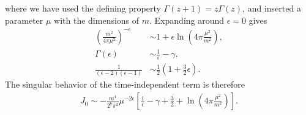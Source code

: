where we have used the defining property $\Gamma(z + 1) = z\Gamma(z)$, and inserted a parameter $\mu$ with the dimensions of $m$.
Expanding around $\epsilon = 0$ gives
\begin{align}
    \left(\frac{m^2}{4 \pi \mu^2}\right)^{- \epsilon}
    &\sim 1 + \epsilon \ln\left(4 \pi \frac{\mu^2}{m^2}\right),\\
    \Gamma(\epsilon) 
    & \sim \frac{1}{\epsilon} - \gamma, \\
    \frac{1}{(\epsilon - 2)(\epsilon - 1)}
    &\sim \frac{1}{2}\left(1 + \frac{3}{2} \epsilon\right).
\end{align}
The singular behavior of the time-independent term is therefore
\begin{align}
    J_0 \sim
    - \frac{m^4}{2^6 \pi^2} \mu^{-2 \epsilon}
    \left[
        \frac{1}{\epsilon} 
        - \gamma + \frac{3}{2}
        + \ln\left(4 \pi \frac{\mu^2}{m^2}\right)
    \right].
\end{align}
